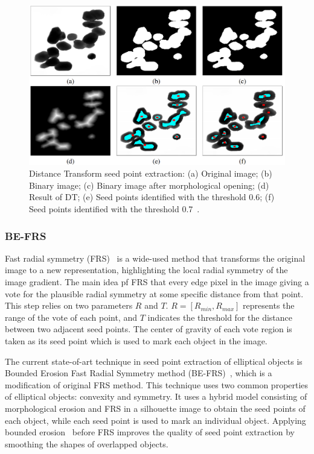 \documentclass{lutmscthesis}[2010/09/22]
\begin{document}
\begin{figure} [ht]
  \includegraphics[width=\linewidth]{DT.png}
  \caption{
    Distance Transform seed point extraction: (a) Original image; (b) Binary image;
    (c) Binary image after morphological opening; 
    (d) Result of DT; 
    (e) Seed points identified with the threshold 0.6; 
    (f) Seed points identified with the threshold 0.7~\cite{zafari-thesis}.}
  \label{fig:DT_img}
\end{figure}


\subsubsection{BE-FRS}

Fast radial symmetry (FRS)~\cite{FRS}  is a wide-used method that transforms the original
image to a new representation, highlighting the local radial symmetry of the image gradient.
The main idea pf FRS that  every edge pixel in the image giving a vote for the plausible radial symmetry at some specific distance from that point. This step relies on two parameters $R$ and $T$. $R = [R_{min} , R_{max}]$ represents the range of the vote of each point, and $T$ indicates the threshold for the distance between two adjacent seed points. The center
of gravity of each vote region is taken as its seed point which is used to mark
each object in the image. 

The current state-of-art technique in seed point extraction of elliptical objects is Bounded Erosion Fast
Radial Symmetry method (BE-FRS)~\cite{BE-FRS}, which is a modification of original FRS method. This technique uses two common properties of elliptical objects: convexity and symmetry.
It uses a hybrid model consisting of morphological erosion and FRS in a
silhouette image to obtain the seed points of each object, while each seed point
is used to mark an individual object. Applying bounded erosion~\cite{BE} before FRS improves the quality of seed point extraction by smoothing the shapes of overlapped objects.
\end{document}
